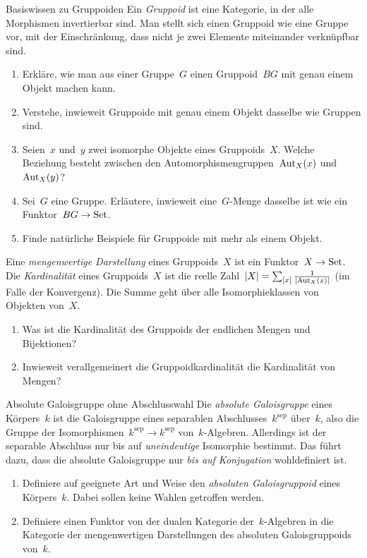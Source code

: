 \documentclass{uebblatt}
\begin{document}

\begin{aufgabe}{Basiswissen zu Gruppoiden}
Ein \emph{Gruppoid} ist eine Kategorie, in der alle Morphismen invertierbar
sind. Man stellt sich einen Gruppoid wie eine Gruppe vor, mit der
Einschränkung, dass nicht je
zwei Elemente miteinander verknüpfbar sind.
\begin{enumerate}
\item Erkläre, wie man aus einer Gruppe~$G$ einen Gruppoid~$BG$ mit genau einem Objekt
machen kann.
\item Verstehe, inwieweit Gruppoide mit genau einem Objekt dasselbe wie Gruppen
sind.
\item Seien~$x$ und~$y$ zwei isomorphe Objekte eines Gruppoids~$X$. Welche
Beziehung besteht zwischen den Automorphismengruppen~$\mathrm{Aut}_X(x)$ und~$\mathrm{Aut}_X(y)$?
\item Sei~$G$ eine Gruppe. Erläutere, inwieweit eine~$G$-Menge dasselbe ist wie ein Funktor~$BG \to
\mathrm{Set}$.
\item Finde natürliche Beispiele für Gruppoide mit mehr als einem Objekt.
\end{enumerate}
Eine \emph{mengenwertige Darstellung} eines Gruppoids~$X$ ist ein Funktor~$X
\to \mathrm{Set}$. Die \emph{Kardinalität} eines Gruppoids~$X$ ist die reelle Zahl~$|X| =
\sum_{[x]} \frac{1}{|\mathrm{Aut}_X(x)|}$ (im Falle der Konvergenz). Die Summe geht
über alle Isomorphieklassen von Objekten von~$X$.
\begin{enumerate}
\addtocounter{enumi}{5}
\item Was ist die Kardinalität des Gruppoids der endlichen Mengen und
Bijektionen?
\item Inwieweit verallgemeinert die Gruppoidkardinalität die Kardinalität von
Mengen?
\end{enumerate}
\end{aufgabe}

\begin{aufgabe}{Absolute Galoisgruppe ohne Abschlusswahl}
Die \emph{absolute Galoisgruppe} eines Körpers~$k$ ist die Galoisgruppe eines
separablen Abschlusses~$k^\mathrm{sep}$ über~$k$, also die Gruppe der
Isomorphismen~$k^\mathrm{sep} \to k^\mathrm{sep}$ von~$k$-Algebren. Allerdings
ist der separable Abschluss nur bis auf \emph{uneindeutige} Isomorphie
bestimmt. Das führt dazu, dass die absolute Galoisgruppe nur \emph{bis auf
Konjugation} wohldefiniert ist.

\begin{enumerate}
\item Definiere auf geeignete Art und Weise den \emph{absoluten Galoisgruppoid}
eines Körpers~$k$. Dabei sollen keine Wahlen getroffen werden.
\item Definiere einen Funktor von der dualen Kategorie der~$k$-Algebren in die
Kategorie der mengenwertigen Darstellungen des absoluten Galoisgruppoids von~$k$.
\end{enumerate}
\end{aufgabe}
\end{document}
